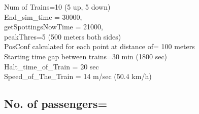 Num of Trains=10 (5 up, 5 down)\\
End\_sim\_time = 30000,\\
getSpottingsNowTime = 21000,\\
peakThres=5 (500 meters both sides)\\
PosConf calculated for each point at distance of= 100 meters\\
Starting time gap between trains=30 min (1800 sec)\\
Halt\_time\_of\_Train = 20 sec\\
Speed\_of\_The\_Train = 14 m/sec (50.4 km/h)\\

\subsection{No. of passengers=\NumUser}
